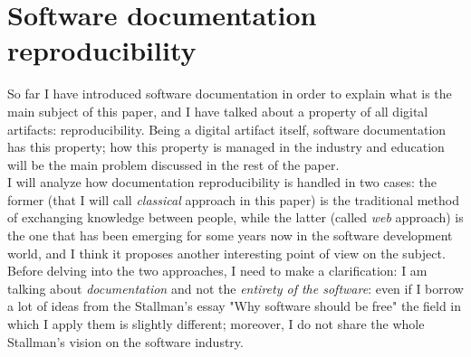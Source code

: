 \documentclass{article}
\begin{document}
	\section{Software documentation reproducibility}
		So far I have introduced software documentation in order to explain what is the main subject of this paper, and I have talked about a property of all digital artifacts: reproducibility. Being a digital artifact itself, software documentation has this property; how this property is managed in the industry and education will be the main problem discussed in the rest of the paper.\\
		I will analyze how documentation reproducibility is handled in two cases: the former (that I will call \textit{classical} approach in this paper) is the traditional method of exchanging knowledge between people, while the latter (called \textit{web} approach) is the one that has been emerging for some years now in the software development world, and I think it proposes another interesting point of view on the subject.\\
		Before delving into the two approaches, I need to make a clarification: I am talking about \textit{documentation} and not the \textit{entirety of the software}: even if I borrow a lot of ideas from the Stallman's essay "Why software should be free"\cite{stallman} the field in which I apply them is slightly different; moreover, I do not share the whole Stallman's vision on the software industry.
\end{document}
